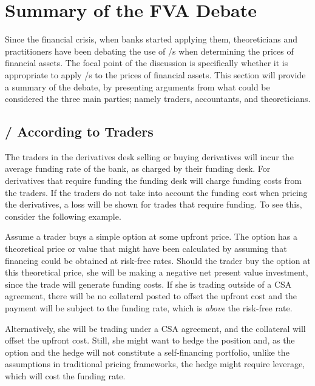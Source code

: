 \documentclass[main.tex]{subfiles}
\begin{document}
    \section{Summary of the FVA Debate}
        Since the financial crisis, when banks started applying them,
        theoreticians and practitioners have been debating the use of \FVA/s
        when determining the prices of financial assets.
        The focal point of the discussion is specifically 
        whether it is appropriate to apply \FVA/s to the prices of financial assets.
        This section will provide a summary of the debate, 
        by presenting arguments from what could be considered the three main parties;
        namely traders, accountants, and theoreticians.

        \subsection{\FVA/ According to Traders}
            The traders in the derivatives desk selling or buying derivatives 
            will incur the average funding rate of the bank, as charged by their funding desk.
            For derivatives that require funding the funding desk will charge funding costs from the traders.
            If the traders do not take into account the funding cost when pricing the derivatives,
            a loss will be shown for trades that require funding.
            To see this, consider the following example.

            \begin{example}
            Assume a trader buys a simple option at some upfront price.
            The option has a theoretical price or value that might have been calculated by assuming
            that financing could be obtained at risk-free rates. 
            Should the trader buy the option at this theoretical price, 
            she will be making a negative net present value investment, 
            since the trade will generate funding costs. 
            If she is trading outside of a CSA agreement, there will be no collateral posted
            to offset the upfront cost and the payment will be subject to the
            funding rate, which is \textit{above} the risk-free rate. 
            
            Alternatively, she will be trading under a CSA agreement,
            and the collateral will offset the upfront cost.
            Still, she might want to hedge the position and, as the option and the hedge
            will not constitute a self-financing portfolio, 
            unlike the assumptions in traditional pricing frameworks,
            the hedge might require leverage, which will cost the funding rate.
            \end{example}
\end{document}
